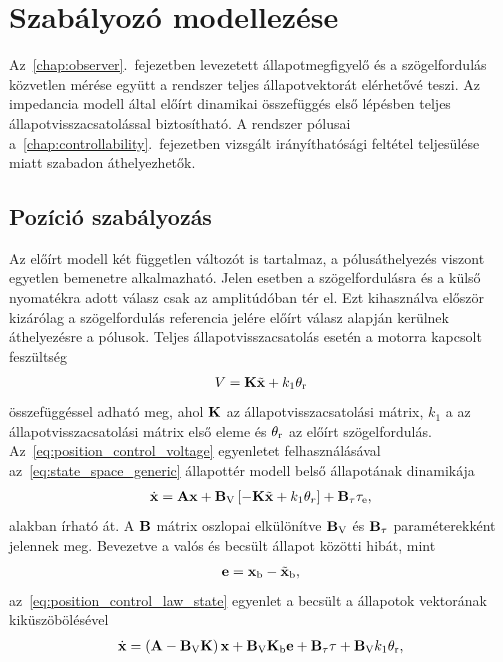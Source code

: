 \chapter{Szabályozó modellezése}\label{chap:controller}

Az~\ref{chap:observer}.\ fejezetben levezetett állapotmegfigyelő és a szögelfordulás közvetlen mérése
együtt a rendszer teljes állapotvektorát elérhetővé teszi. Az impedancia modell által előírt dinamikai összefüggés
első lépésben teljes állapotvisszacsatolással biztosítható. A rendszer pólusai a~\ref{chap:controllability}.\ fejezetben
vizsgált irányíthatósági feltétel teljesülése miatt szabadon áthelyezhetők.

\section{Pozíció szabályozás}
Az előírt modell két független változót is tartalmaz, a pólusáthelyezés viszont egyetlen bemenetre 
alkalmazható. Jelen esetben a szögelfordulásra és a külső nyomatékra adott válasz csak az amplitúdóban
tér el. Ezt kihasználva először kizárólag a szögelfordulás referencia jelére előírt válasz alapján 
kerülnek áthelyezésre a pólusok. Teljes állapotvisszacsatolás esetén a motorra kapcsolt feszültség
\begin{align}\label{eq:position_control_voltage}
    V = \mathbf{K} \tilde{\mathbf{x}} + k_1 \theta_{\mathrm{r}}
\end{align}
összefüggéssel adható meg, 
ahol $\mathbf{K}$ az állapotvisszacsatolási mátrix, 
$k_1$ a az állapotvisszacsatolási mátrix első eleme és 
$\theta_{\mathrm{r}}$ az előírt szögelfordulás. Az~\eqref{eq:position_control_voltage} egyenletet felhasználásával
az~\eqref{eq:state_space_generic} állapottér modell belső állapotának dinamikája
\begin{align}\label{eq:position_control_law_state}
    \dot{\mathbf{x}} = \mathbf{A} \mathbf{x} + \mathbf{B}_{\mathrm{V}}\left[-\mathbf{K} \tilde{\mathbf{x}} + k_1 \theta_r\right] + \mathbf{B}_{\mathrm{\tau}} \tau_{\mathrm{e}},
\end{align}
alakban írható át. A $\mathbf{B}$ mátrix oszlopai elkülönítve $\mathbf{B}_{\mathrm{V}}$ és $\mathbf{B}_{\mathrm{\tau}}$ paraméterekként jelennek meg.
Bevezetve a valós és becsült állapot közötti hibát, mint
\begin{align}
    \mathbf{e} = \mathbf{x}_{\mathrm{b}} - \tilde{\mathbf{x}}_{\mathrm{b}},
\end{align}
az~\eqref{eq:position_control_law_state} egyenlet a becsült a állapotok vektorának kiküszöbölésével
\begin{align}
    \dot{\mathbf{x}} = \left(\mathbf{A} - \mathbf{B}_{\mathrm{V}} \mathbf{K}\right) \mathbf{x} + 
    \mathbf{B}_{\mathrm{V}} \mathbf{K}_{\mathrm{b}} \mathbf{e} + 
    \mathbf{B}_{\mathrm{\tau}} \tau + 
    \mathbf{B}_{\mathrm{V}} k_1 \theta_{\mathrm{r}},
\end{align}
